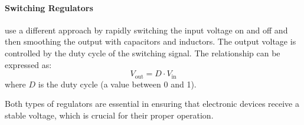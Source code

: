 \paragraph{Switching Regulators} use a different approach by rapidly switching the input voltage on and off and then smoothing the output with capacitors and inductors. The output voltage is controlled by the duty cycle of the switching signal. The relationship can be expressed as:
\[
V_{\text{out}} = D \cdot V_{\text{in}}
\]
where \( D \) is the duty cycle (a value between 0 and 1).

Both types of regulators are essential in ensuring that electronic devices receive a stable voltage, which is crucial for their proper operation.


